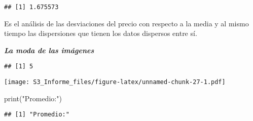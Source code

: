 \documentclass[
]{article}
\newenvironment{Shaded}{\begin{snugshade}}{\end{snugshade}}
\newcommand{\AttributeTok}[1]{\textcolor[rgb]{0.77,0.63,0.00}{#1}}
\newcommand{\ControlFlowTok}[1]{\textcolor[rgb]{0.13,0.29,0.53}{\textbf{#1}}}
\newcommand{\FunctionTok}[1]{\textcolor[rgb]{0.00,0.00,0.00}{#1}}
\newcommand{\NormalTok}[1]{#1}
\newcommand{\OtherTok}[1]{\textcolor[rgb]{0.56,0.35,0.01}{#1}}
\newcommand{\SpecialCharTok}[1]{\textcolor[rgb]{0.00,0.00,0.00}{#1}}
\newcommand{\StringTok}[1]{\textcolor[rgb]{0.31,0.60,0.02}{#1}}
\begin{document}
\begin{verbatim}
## [1] 1.675573
\end{verbatim}

Es el análisis de las desviaciones del precio con respecto a la media y
al mismo tiempo las dispersiones que tienen los datos dispersos entre
sí.

\textbf{\emph{La moda de las imágenes}}

\begin{Shaded}
\end{Shaded}

\begin{verbatim}
## [1] 5
\end{verbatim}

\begin{Shaded}
\end{Shaded}

\texttt{[image: S3\_Informe\_files/figure-latex/unnamed-chunk-27-1.pdf]}

\begin{Shaded}
\begin{Highlighting}[]
\FunctionTok{print}\NormalTok{(}\StringTok{"Promedio:"}\NormalTok{)}
\end{Highlighting}
\end{Shaded}

\begin{verbatim}
## [1] "Promedio:"
\end{verbatim}
\end{document}
